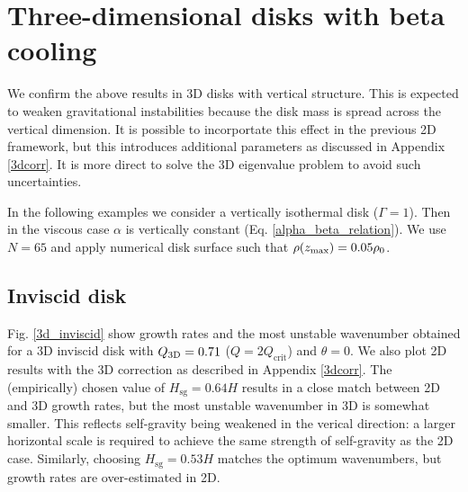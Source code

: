\section{Three-dimensional disks with beta cooling}\label{3ddisk}
We confirm the above results in 3D disks with vertical
structure. This is expected to weaken gravitational instabilities
because the disk mass is spread across the vertical dimension. It is
possible to incorportate this effect in the previous 2D framework, but this
introduces additional parameters as discussed in Appendix
\ref{3dcorr}. It is more direct to solve the 3D eigenvalue problem to
avoid such uncertainties. 

In the following examples we consider a vertically isothermal disk
($\Gamma=1$). Then in the viscous case $\alpha$ is vertically
constant (Eq. \ref{alpha_beta_relation}). We use $N=65$  and apply
numerical disk surface such that $\rho(z_\mathrm{max})=0.05\rho_0$.   

\subsection{Inviscid disk}

Fig. \ref{3d_inviscid} show growth rates and the most unstable wavenumber
obtained for a 3D inviscid disk with $Q_\mathrm{3D}=0.71$
($Q=2Q_\mathrm{crit}$) and $\theta=0$. We also plot 2D
results with the 3D correction as described in Appendix
\ref{3dcorr}. The (empirically) chosen value of
$H_\mathrm{sg}=0.64H$ results in a close match between 2D and 3D
growth rates, but the most unstable wavenumber in 3D is somewhat smaller. 
This reflects self-gravity being weakened in the verical 
direction: a larger horizontal scale is required to achieve the same
strength of self-gravity as the 2D case. Similarly, 
choosing $H_\mathrm{sg}=0.53H$ matches the optimum wavenumbers, but
growth rates are over-estimated in 2D.    

